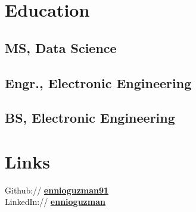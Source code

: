 \documentclass[letterpaper]{deedy-resume} %
\begin{document}
\begin{minipage}[t]{0.33\textwidth}
\section{Education} 


\subsection{MS, Data Science}


\sectionspace %

\subsection{Engr., Electronic Engineering}

\sectionspace %


\subsection{BS, Electronic Engineering}
\sectionspace %



\section{Links} 

Github:// \href{https://github.com/ennioguzman91}{\bf ennioguzman91} \\
LinkedIn:// \href{https://www.linkedin.com/in/ennio-guzman-42236b126/}{\bf ennioguzman} \\


\sectionspace %


\end{minipage} %
\end{document}

